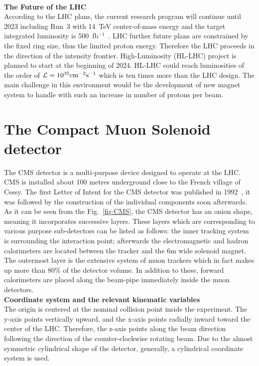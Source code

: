 \\
\textbf{The Future of the LHC}\\
According to the LHC plans, the current research program will continue until 2023 including Run~3 with 14~TeV center-of-mass energy and the target integrated luminosity is 500~fb$^{-1}$~\cite{LHC_time}.
LHC further future plans are constrained by the fixed ring size, thus the limited proton energy.  Therefore the LHC proceeds in the direction of the intensity frontier. High-Luminosity (HL-LHC) project is planned to start at the beginning of 2024. HL-LHC could reach luminosities of the order of $\mathcal{L}=10^{35}{\rm cm^{-2}s^{-1}}$ which is ten times more than the LHC design. The main challenge in this environment would be the development of new magnet system to handle with such an increase in number of protons per beam.
\newpage
\section{The Compact Muon Solenoid detector}
\label{sec:cms_ex}
The CMS detector is a multi-purpose device designed to operate at the LHC. CMS is installed about 100 metres underground close to the French village of Cessy.
The first Letter of Intent for the CMS detector was published in 1992~\cite{CMS_FirstLet}, it was followed by the construction of the individual components soon afterwards. \\
As it can be seen from the Fig.~\ref{fig:CMS}, the CMS detector has an onion shape, meaning it incorporates successive layers. These layers which are corresponding to various purpose sub-detectors can be listed as follows: the inner tracking system is surrounding the interaction point; afterwards the electromagnetic and hadron calorimeters are located between the tracker and the 6m wide solenoid magnet. The outermost layer is the extensive system of muon trackers which in fact makes up more than 80\% of the detector volume. In addition to these, forward calorimeters are placed along the beam-pipe immediately inside the muon detectors.\\
\textbf{Coordinate system and the relevant kinematic variables}\\
The origin is centered at the nominal collision point inside the experiment. The y-axis points vertically upward, and the x-axis points radially inward toward the center of the LHC. Therefore, the z-axis points along the beam direction following the direction of the counter-clockwise rotating beam. Due to the almost symmetric cylindrical shape of the detector, generally, a cylindrical coordinate system is used. 
